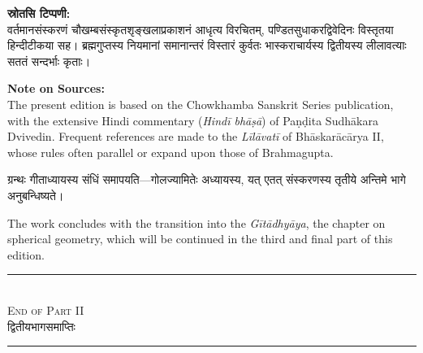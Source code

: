 \documentclass[10pt,a4paper]{article}
\newcommand{\dev}[1]{{\devanagarifont #1}}
\newcommand{\bilingual}[2]{%
  \noindent%
  \begin{minipage}[t]{0.47\textwidth}%
    \setstretch{1.15}#1%
  \end{minipage}%
  \hfill%
  \vrule\hfill%
  \begin{minipage}[t]{0.47\textwidth}%
    \setstretch{1.15}#2%
  \end{minipage}%
  \par\medskip
}
\begin{document}
\vspace{1em}
\bilingual{%
\textbf{स्रोतसि टिप्पणी:}\\[0.3em]
वर्तमानसंस्करणं चौखम्बसंस्कृतशृङ्खलाप्रकाशनं आधृत्य विरचितम्, पण्डितसुधाकरद्विवेदिनः विस्तृतया हिन्दीटीकया सह। ब्रह्मगुप्तस्य नियमानां समानान्तरं विस्तारं कुर्वतः भास्कराचार्यस्य द्वितीयस्य लीलावत्याः सततं सन्दर्भाः कृताः।
}{%
\textbf{Note on Sources:}\\[0.3em]
The present edition is based on the Chowkhamba Sanskrit Series publication, with the extensive Hindi commentary (\textit{Hindī bhāṣā}) of Paṇḍita Sudhākara Dvivedin. Frequent references are made to the \textit{Līlāvatī} of Bhāskarācārya II, whose rules often parallel or expand upon those of Brahmagupta.
}

\vspace{1em}
\bilingual{%
ग्रन्थः गीताध्यायस्य संधिं समापयति---गोलज्यामितेः अध्यायस्य, यत् एतत् संस्करणस्य तृतीये अन्तिमे भागे अनुबन्धिष्यते।
}{%
The work concludes with the transition into the \textit{Gītādhyāya}, the chapter on spherical geometry, which will be continued in the third and final part of this edition.
}

\vfill
\begin{center}
\rule{0.5\textwidth}{0.4pt}\\[0.5em]
\textsc{End of Part II}\\[0.3em]
\dev{द्वितीयभागसमाप्तिः}\\[0.5em]
\rule{0.5\textwidth}{0.4pt}
\end{center}
\end{document}
